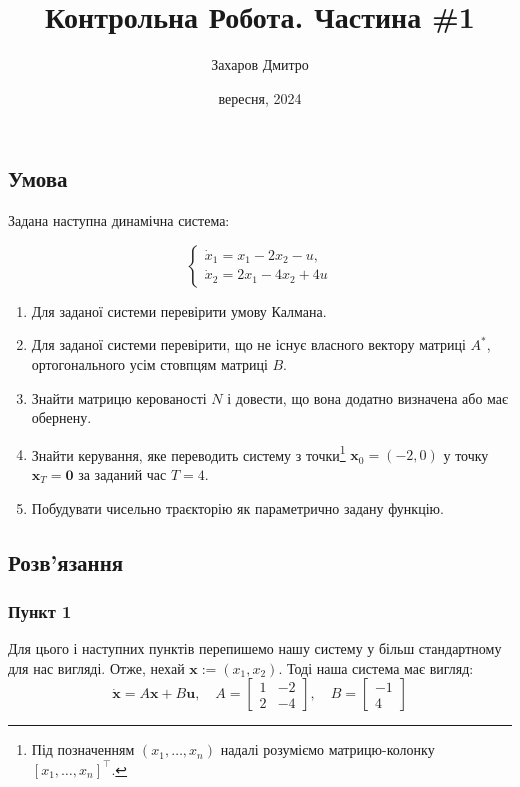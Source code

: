 \documentclass{hw_template}
\title{\huge\sffamily\bfseries Контрольна Робота. Частина \#1}
\author{\Large\sffamily Захаров Дмитро}
\date{\sffamily 12 вересня, 2024}
\begin{document}
\pagestyle{fancy}

\maketitle

\subsection*{Умова}

Задана наступна динамічна система:

\begin{equation*}
    \begin{cases}
        \dot{x}_1 = x_1 - 2x_2 - u, \\
        \dot{x}_2 = 2x_1 - 4x_2 + 4u
    \end{cases}
\end{equation*}

\begin{enumerate}
    \item Для заданої системи перевірити умову Калмана.
    \item Для заданої системи перевірити, що не існує власного вектору матриці $A^*$, ортогонального усім стовпцям матриці $B$.
    \item Знайти матрицю керованості $N$ і довести, що вона додатно визначена або має обернену.
    \item Знайти керування, яке переводить систему з точки\footnote{Під позначенням $(x_1,\dots,x_n)$ надалі розуміємо матрицю-колонку $[x_1,\dots,x_n]^{\top}$.} $\mathbf{x}_0 = (-2,0)$ у точку $\mathbf{x}_T = \mathbf{0}$ за заданий час $T=4$.
    \item Побудувати чисельно траєкторію як параметрично задану функцію.
\end{enumerate}

\subsection*{Розв'язання}

\subsubsection*{Пункт 1}

Для цього і наступних пунктів перепишемо нашу систему у більш стандартному для нас вигляді. Отже, нехай $\mathbf{x} := (x_1,x_2)$. Тоді наша система має вигляд:
\begin{equation*}
    \dot{\mathbf{x}} = A\mathbf{x} + B\mathbf{u}, \quad A = \begin{bmatrix}
        1 & -2 \\
        2 & -4
    \end{bmatrix}, \quad B = \begin{bmatrix}
        -1 \\ 4
    \end{bmatrix}
\end{equation*}
\end{document}
